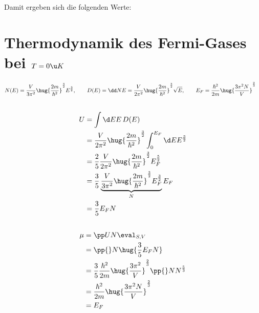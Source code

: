 \documentclass[exa]{exercise_5.0}
\begin{document}
Damit ergeben sich die folgenden Werte:

\begin{table}[H]
    \centering
    
\end{table}

\section{Thermodynamik des Fermi-Gases bei $T=0\u K $}
\begin{align*}
    N(E) &= \frac{V}{3\pi^2} \hug{\frac{2m}{\hbar^2}}^{\frac32} E^\frac32,\qquad
    D(E) = \dd NE = \frac{V}{2\pi^2} \hug{\frac{2m}{\hbar^2}}^{\frac32} \sqrt E,\qquad
    E_F = \frac{\hbar^2}{2m}\hug{\frac{3\pi^2 N}{V}}^\frac23
\end{align*}
\subsection{}
\begin{align*}
    U &= \int \d E E \,D(E)\\
    &= \frac{V}{2\pi^2}\hug{\frac{2m}{\hbar^2}}^{\frac32} \int_0^{E_F} \d E E^\frac32\\
    &= \frac25 \frac{V}{2\pi^2}\hug{\frac{2m}{\hbar^2}}^{\frac32} E_F^\frac52\\
    &= \frac35 \underbrace{\frac{V}{3\pi^2}\hug{\frac{2m}{\hbar^2}}^{\frac32} E_F^\frac32}_{N} E_F\\
    &= \frac 35 E_F N 
\end{align*}

\subsection{}
\begin{align*}
    \mu &= \pp UN \eval_{S,V} \\
    &= \pp{}N \hug{\frac 35 E_F N}\\
    &= \frac 35  \frac{\hbar^2}{2m}\hug{\frac{3\pi^2}{V}}^\frac23 \pp{}N N ^\frac53\\
    &= \frac{\hbar^2}{2m}\hug{\frac{3\pi^2N}{V}}^\frac23\\
    &= E_F
\end{align*}
\end{document}
